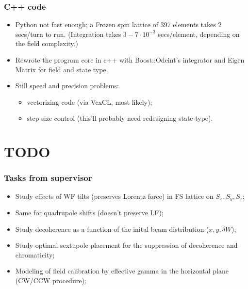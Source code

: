\documentclass[pdf]{beamer}
\begin{document}
\begin{frame}
\begin{columns}
\begin{minipage}{.3\textheight}
			\end{minipage}
		\end{columns}
	\end{frame}

	\begin{frame}
		\frametitle{C++ code}
		\begin{itemize}
			\item Python not fast enough; a Frozen spin lattice of 397 elements takes 2 secs/turn to run. (Integration takes $3-7\cdot 10^{-3}$ secs/element, depending on the field complexity.)
			\item Rewrote the program core in c++ with Boost::Odeint's integrator and Eigen Matrix for field and state type.
			\item Still speed and precision problems:
			\begin{itemize}
				\item vectorizing code (via VexCL, most likely);
				\item step-size control (this'll probably need redesigning state-type).
			\end{itemize}
		\end{itemize}
	\end{frame}

\section{TODO}
	\begin{frame}
		\frametitle{Tasks from supervisor}
		\begin{itemize}
			\item Study effects of WF tilts (preserves Lorentz force) in FS lattice on $S_x, S_y, S_z$;
			\item Same for quadrupole shifts (doesn't preserve LF);
			\item Study decoherence as a function of the inital beam distribution ($x, y, \delta W$);
			\item Study optimal sextupole placement for the suppression of decoherence and chromaticity;
			\item Modeling of field calibration by effective gamma in the horizontal plane (CW/CCW procedure);
		\end{itemize}
	\end{frame}
\end{document}
